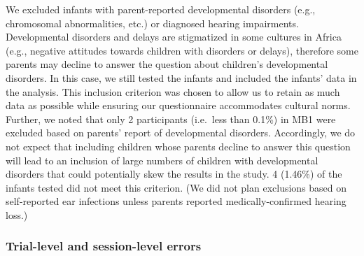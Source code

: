 \documentclass[
  ,man,floatsintext]{apa6}
\begin{document}
We excluded infants with parent-reported developmental disorders (e.g., chromosomal abnormalities, etc.) or diagnosed hearing impairments. Developmental disorders and delays are stigmatized in some cultures in Africa (e.g., negative attitudes towards children with disorders or delays), therefore some parents may decline to answer the question about children's developmental disorders. In this case, we still tested the infants and included the infants' data in the analysis. This inclusion criterion was chosen to allow us to retain as much data as possible while ensuring our questionnaire accommodates cultural norms. Further, we noted that only 2 participants (i.e.~less than 0.1\%) in MB1 were excluded based on parents' report of developmental disorders. Accordingly, we do not expect that including children whose parents decline to answer this question will lead to an inclusion of large numbers of children with developmental disorders that could potentially skew the results in the study. 4 (1.46\%) of the infants tested did not meet this criterion. (We did not plan exclusions based on self-reported ear infections unless parents reported medically-confirmed hearing loss.)

\hypertarget{trial-level-and-session-level-errors}{%
\subsubsection{Trial-level and session-level errors}\label{trial-level-and-session-level-errors}}
\end{document}
